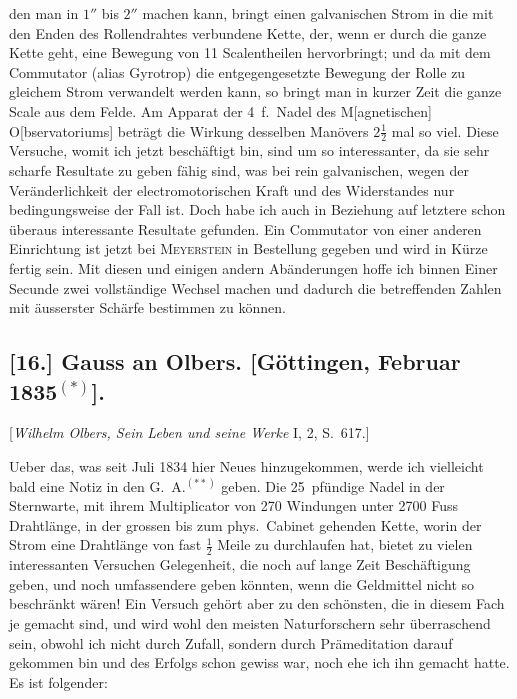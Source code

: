 \documentclass[12pt,a4paper]{article}
\begin{document}
den man in $1''$ bis $2''$ machen kann, bringt einen galvanischen Strom in die mit den Enden des Rollendrahtes verbundene Kette, der, wenn er durch die ganze Kette geht, eine Bewegung von 11 Scalentheilen hervorbringt; und da mit dem Commutator (alias Gyrotrop) die entgegengesetzte Bewegung der Rolle zu gleichem Strom verwandelt werden kann, so bringt man in kurzer Zeit die ganze Scale aus dem Felde. Am Apparat der 4~\textPi f.~Nadel des M[agnetischen] O[bservatoriums] betr\"agt die Wirkung desselben Man\"overs $2\frac12$ mal so viel. Diese Versuche, womit ich jetzt besch\"aftigt bin, sind um so interessanter, da sie sehr scharfe Resultate zu geben f\"ahig sind, was bei rein galvanischen, wegen der Ver\"anderlichkeit der electromotorischen Kraft und des Widerstandes nur bedingungsweise der Fall ist. Doch habe ich auch in Beziehung auf letztere schon \"uberaus interessante Resultate gefunden. Ein Commutator von einer anderen Einrichtung ist jetzt bei \textsc{Meyerstein} in Bestellung gegeben und wird in K\"urze fertig sein. Mit diesen und einigen andern Ab\"anderungen hoffe ich binnen Einer Secunde zwei vollst\"andige Wechsel machen und dadurch die betreffenden Zahlen mit \"ausserster Sch\"arfe bestimmen zu k\"onnen.


\subsection*{[16.] Gauss an Olbers. [G\"ottingen, Februar 1835$^{(*)}$].}

[\textit{Wilhelm Olbers, Sein Leben und seine Werke} I, 2, S.~617.]

\medskip\noindent
Ueber das, was seit Juli 1834 hier Neues hinzugekommen, werde ich vielleicht bald eine Notiz in den G.~A.$^{(**)}$ geben. Die 25~pf\"undige Nadel in der Sternwarte, mit ihrem Multiplicator von 270 Windungen unter 2700 Fuss Drahtl\"ange, in der grossen bis zum phys.~Cabinet gehenden Kette, worin der Strom eine Drahtl\"ange von fast $\frac12$ Meile zu durchlaufen hat, bietet zu vielen interessanten Versuchen Gelegenheit, die noch auf lange Zeit Besch\"aftigung geben, und noch umfassendere geben k\"onnten, wenn die Geldmittel nicht so beschr\"ankt w\"aren! Ein Versuch geh\"ort aber zu den sch\"onsten, die in diesem Fach je gemacht sind, und wird wohl den meisten Naturforschern sehr \"uberraschend sein, obwohl ich nicht durch Zufall, sondern durch Pr\"ameditation darauf gekommen bin und des Erfolgs schon gewiss war, noch ehe ich ihn gemacht hatte. Es ist folgender:
\end{document}

